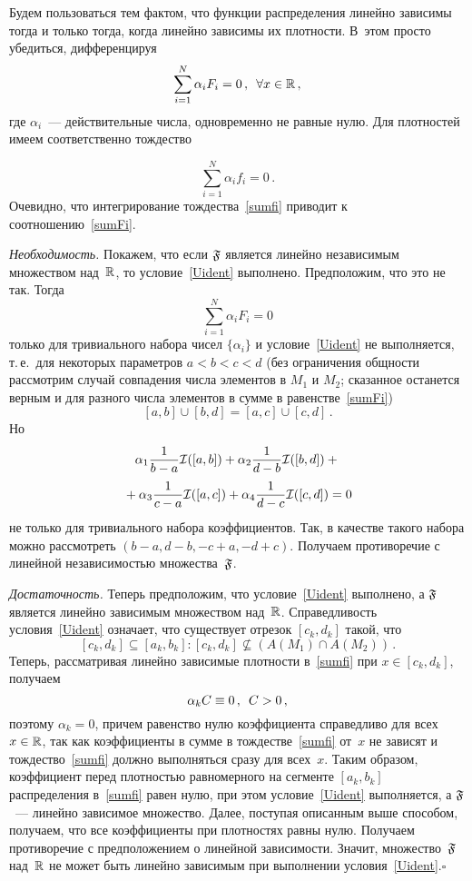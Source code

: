 \begin{multicols}{2}
Будем пользоваться тем фактом, что функции распределения линейно
зависимы тогда и только тогда, когда линейно зависимы их плотности. 
В~этом просто убедиться, дифференцируя
\begin{equation}
\label{sumFi}
\sum\limits_{i=1}^N \alpha_iF_i=0\,,\enskip\forall x\in\mathbb{R}\,,
\end{equation}
где $\alpha_i$~--- действительные числа, одновременно не
равные нулю. Для плотностей имеем соответственно тождество

\begin{equation}
\label{sumfi}
\sum\limits_{i=1}^N \alpha_if_i=0\,.
\end{equation}
Очевидно, что интегрирование тождества~\eqref{sumfi} приводит к
соотношению~\eqref{sumFi}.

\smallskip

\textit{Необходимость.} Покажем, что если $\mathfrak F$ является линейно
независимым множеством над~$\mathbb{R}$, то условие~\eqref{Uident}
выполнено. Предположим, что это не так. Тогда
\begin{equation*}
\sum\limits_{i=1}^N \alpha_iF_i=0
\end{equation*}
только для тривиального набора чисел $\{\alpha_i\}$ и
условие~\eqref{Uident} не выполняется, т.\,е.\ для некоторых параметров
$a<b<c<d$ (без ограничения общности рассмотрим случай совпадения
числа элементов в $M_1$ и $M_2$; сказанное останется верным и для
разного числа элементов в сумме в равенстве~\eqref{sumFi})
$$
[a,b]\cup[b,d]=[a,c]\cup[c,d]\,.
$$
Но
\begin{multline*}
\alpha_1\displaystyle\frac{\displaystyle 1\mathstrut}{\displaystyle b-a\mathstrut}\mathcal I([a,b])+\alpha_2\displaystyle\frac{\displaystyle 1\mathstrut}{\displaystyle d-b\mathstrut}\mathcal I([b,d])+{}\\
{}+
\alpha_3\displaystyle\frac{\displaystyle 1\mathstrut}{\displaystyle c-a\mathstrut}\mathcal I([a,c])+\alpha_4\displaystyle\frac{\displaystyle 1\mathstrut}{\displaystyle d-c\mathstrut}\mathcal I([c,d])=0
\end{multline*}
не только для тривиального набора коэффициентов. Так, в качестве
такого набора можно рассмотреть $(b-a,d-b,-c+a,-d+c)$. Получаем
противоречие с линейной независимостью множества~$\mathfrak F$.

\smallskip

\textit{Достаточность.} Теперь предположим, что условие~\eqref{Uident}
выполнено, а $\mathfrak F$ является линейно зависимым множеством над~$\mathbb{R}$.
Справедливость условия~\eqref{Uident} означает, что существует
отрезок $[c_k,d_k]$ такой, что
$$
[c_k,d_k]\subseteq[a_k, b_k]:[c_k,d_k]\nsubseteq\left( A(M_1)\cap
A(M_2)\right)\,.
$$
Теперь, рассматривая линейно зависимые плот\-ности в~\eqref{sumfi} при
$x\in[c_k,d_k]$, получаем
$$
\alpha_k C\equiv0\,,\enskip C>0\,,
$$
поэтому $\alpha_k=0$, причем равенство нулю коэффициента справедливо
для всех $x\hm\in\r$, так как коэффициенты в сумме в
тождестве~\eqref{sumfi} от~$x$ не зависят и тождество~\eqref{sumfi}
должно выполняться сразу для всех~$x$. Таким образом, коэффициент
перед плотностью равномерного на сегменте $[a_k, b_k]$ распределения
в~\eqref{sumfi} равен нулю, при этом условие~\eqref{Uident}
выполняется, а $\mathfrak F$~--- линейно зависимое множество. Далее, поступая
описанным выше способом, получаем, что все коэффициенты при
плотностях равны нулю. Получаем противоречие с предположением о
линейной зависимости. Значит, множество~$\mathfrak F$ над~$\mathbb{R}$ не может быть
линейно зависимым при выполнении условия~\eqref{Uident}.\hfill$\square$


\end{multicols}
